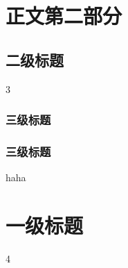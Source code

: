 ﻿\chapter{正文第二部分}
\section{二级标题}
 3
\subsection{三级标题}
\subsection{三级标题}
 h\citep{a}aha\citep{m}
\chapter{一级标题}
4
